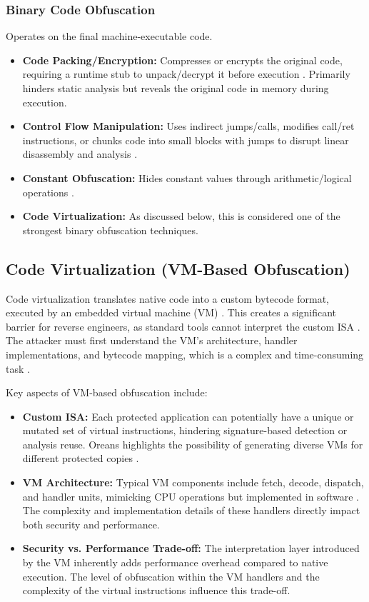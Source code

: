 \subsubsection{Binary Code Obfuscation} Operates on the final machine-executable code.
\begin{itemize}
    \item \textbf{Code Packing/Encryption:} Compresses or encrypts the original code, requiring a runtime stub to unpack/decrypt it before execution \cite{Rou13}. Primarily hinders static analysis but reveals the original code in memory during execution.
    \item \textbf{Control Flow Manipulation:} Uses indirect jumps/calls, modifies call/ret instructions, or chunks code into small blocks with jumps to disrupt linear disassembly and analysis \cite{Rou13}.
    \item \textbf{Constant Obfuscation:} Hides constant values through arithmetic/logical operations \cite{Rou13}.
    \item \textbf{Code Virtualization:} As discussed below, this is considered one of the strongest binary obfuscation techniques.
\end{itemize}

\subsection{Code Virtualization (VM-Based Obfuscation)}
Code virtualization translates native code into a custom bytecode format, executed by an embedded virtual machine (VM) \cite{Ore06, Zho24}. This creates a significant barrier for reverse engineers, as standard tools cannot interpret the custom ISA \cite{Sal18}. The attacker must first understand the VM's architecture, handler implementations, and bytecode mapping, which is a complex and time-consuming task \cite{Don20, Hac24}.

Key aspects of VM-based obfuscation include:
\begin{itemize}
    \item \textbf{Custom ISA:} Each protected application can potentially have a unique or mutated set of virtual instructions, hindering signature-based detection or analysis reuse. Oreans highlights the possibility of generating diverse VMs for different protected copies \cite{Ore06}.
    \item \textbf{VM Architecture:} Typical VM components include fetch, decode, dispatch, and handler units, mimicking CPU operations but implemented in software \cite{Sal18, Hac24}. The complexity and implementation details of these handlers directly impact both security and performance.
    \item \textbf{Security vs. Performance Trade-off:} The interpretation layer introduced by the VM inherently adds performance overhead compared to native execution. The level of obfuscation within the VM handlers and the complexity of the virtual instructions influence this trade-off.
\end{itemize}

